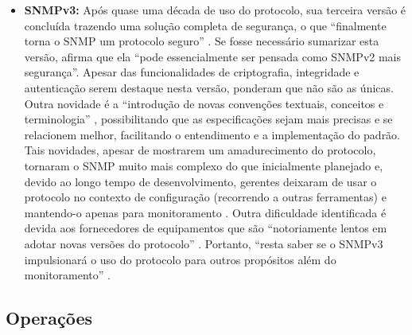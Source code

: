 \documentclass[twoside,english,brazilian]{UNISINOSmonografia}
\begin{document}
\begin{itemize}
\item \textbf{SNMPv3:}
Após quase uma década de uso do protocolo, sua terceira versão é concluída 
trazendo uma solução completa de segurança, o que ``finalmente torna o SNMP um 
protocolo seguro'' \cite{Clemm2006}.
Se fosse necessário sumarizar esta versão,  afirma que 
ela ``pode essencialmente ser pensada como SNMPv2 mais segurança''.
Apesar das funcionalidades de criptografia, integridade e autenticação serem 
destaque nesta versão,  ponderam que não são as únicas.
Outra novidade é a ``introdução de novas convenções textuais, conceitos e 
terminologia'' \cite{Mauro2009}, possibilitando que as especificações sejam 
mais precisas e se relacionem melhor, facilitando o entendimento e 
a implementação do padrão.
Tais novidades, apesar de mostrarem um amadurecimento do protocolo, tornaram o 
SNMP muito mais complexo do que inicialmente planejado e, devido ao longo 
tempo de desenvolvimento, gerentes deixaram de usar o protocolo no contexto de 
configuração (recorrendo a outras ferramentas) e mantendo-o apenas para 
monitoramento \cite{Clemm2006}.
Outra dificuldade identificada é devida aos fornecedores de equipamentos que 
são ``notoriamente lentos em adotar novas versões do protocolo'' 
\cite{Ding2009}.
Portanto, ``resta saber se o SNMPv3 impulsionará o uso do protocolo para 
outros propósitos além do monitoramento'' \cite{Clemm2006}.

\end{itemize}

\subsection{Operações}





\end{document}
